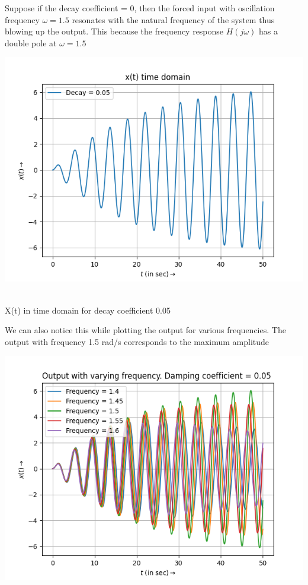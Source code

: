 \documentclass[12pt, a4paper]{report}
\begin{document}
Suppose if the decay coefficient = 0, then the forced input with oscillation frequency $\omega = 1.5$ resonates with the natural frequency of the system thus blowing up the output. This because the frequency response $H(j\omega)$ has a double pole at $\omega = 1.5$

\begin{center}
	\includegraphics[scale=0.8]{Figure_1} 
	\caption{\\X(t) in time domain for decay coefficient 0.05}
	\label{fig:rawdata}
\end{center}


We can also notice this while plotting the output for various frequencies. The output with frequency 1.5 rad/s corresponds to the maximum amplitude 

\begin{center}
	\includegraphics[scale=0.8]{Figure_2} 
	\label{fig:rawdata}
\end{center}
\clearpage
\end{document}
